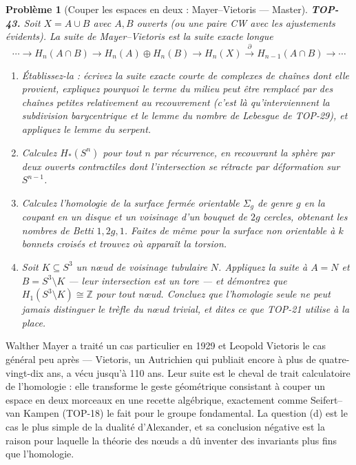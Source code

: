 \documentclass[11pt]{article}
\newtheorem{problem}{Problème}
\begin{document}
\bigskip

\begin{problem}[{Couper les espaces en deux : Mayer--Vietoris --- Master}]
\textbf{TOP-43.} Soit $ X = A \cup B $ avec $ A, B $ ouverts (ou une paire CW avec les
ajustements évidents). La suite de Mayer--Vietoris est la suite exacte longue
\[ \cdots \to H_n(A \cap B) \to H_n(A) \oplus H_n(B) \to H_n(X)
\xrightarrow{\ \partial\ } H_{n-1}(A \cap B) \to \cdots \]
\begin{enumerate}
\item[(a)] Établissez-la : écrivez la suite exacte courte de complexes de chaînes dont elle provient,
expliquez pourquoi le terme du milieu peut être remplacé par des chaînes petites relativement au
recouvrement (c'est là qu'interviennent la subdivision barycentrique et le lemme du nombre de Lebesgue
de TOP-29), et appliquez le lemme du serpent.
\item[(b)] Calculez $ H_*(S^n) $ pour tout $ n $ par récurrence, en recouvrant la sphère par deux ouverts
contractiles dont l'intersection se rétracte par déformation sur $ S^{n-1} $.
\item[(c)] Calculez l'homologie de la surface fermée orientable $ \Sigma_g $ de genre $ g $ en la coupant
en un disque et un voisinage d'un bouquet de $ 2g $ cercles, obtenant les nombres de Betti
$ 1, 2g, 1 $. Faites de même pour la surface non orientable à $ k $ bonnets croisés et trouvez où
apparaît la torsion.
\item[(d)] Soit $ K \subseteq S^3 $ un n\oe{}ud de voisinage tubulaire $ N $. Appliquez la suite à
$ A = N $ et $ B = S^3 \setminus K $ --- leur intersection est un tore --- et démontrez que
$ H_1(S^3 \setminus K) \cong \mathbb{Z} $ pour \textit{tout} n\oe{}ud. Concluez que l'homologie seule ne peut
jamais distinguer le trèfle du n\oe{}ud trivial, et dites ce que TOP-21 utilise à la place.
\end{enumerate}

\end{problem}

\noindent Walther Mayer a traité un cas particulier en 1929 et Leopold Vietoris le cas général
peu après --- Vietoris, un Autrichien qui publiait encore à plus de quatre-vingt-dix ans, a vécu jusqu'à
110 ans. Leur suite est le cheval de trait calculatoire de l'homologie : elle transforme le geste
géométrique consistant à couper un espace en deux morceaux en une recette algébrique, exactement comme
Seifert--van Kampen (TOP-18) le fait pour le groupe fondamental. La question (d) est le cas le plus simple
de la dualité d'Alexander, et sa conclusion négative est la raison pour laquelle la théorie des n\oe{}uds a dû
inventer des invariants plus fins que l'homologie.
\end{document}
